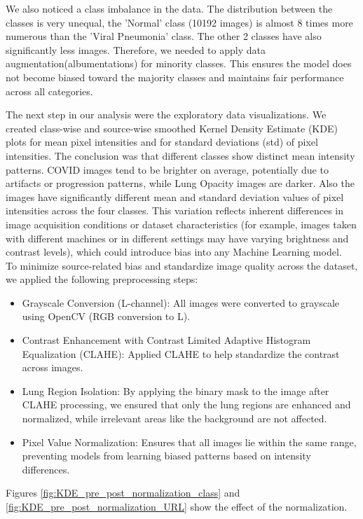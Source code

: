 \documentclass{article}
\begin{document}
We also noticed a class imbalance in the data. The distribution between the classes is very unequal, the 'Normal' class (10192 images) is almost 8 times more numerous than the 'Viral Pneumonia' class. The other 2 classes have also significantly less images. Therefore, we needed to apply data augmentation(albumentations) for minority classes. This ensures the model does not become biased toward the majority classes and maintains fair performance across all categories.

The next step in our analysis were the exploratory data visualizations. We created class-wise and source-wise smoothed Kernel Density Estimate (KDE) plots for mean pixel intensities and for standard deviations (std) of pixel intensities. The conclusion was that different classes show distinct mean intensity patterns. COVID images tend to be brighter on average, potentially due to artifacts or progression patterns, while Lung Opacity images are darker. Also the images have significantly different mean and standard deviation values of pixel intensities across the four classes. This variation reflects inherent differences in image acquisition conditions or dataset characteristics (for example, images taken with different machines or in different settings may have varying brightness and contrast levels), which could introduce bias into any Machine Learning model.\\
To minimize source-related bias and standardize image quality across the dataset, we applied the following preprocessing steps:
\begin{itemize}
    \item Grayscale Conversion (L-channel): All images were converted to grayscale using OpenCV (RGB conversion to L).
    \item Contrast Enhancement with Contrast Limited Adaptive Histogram Equalization (CLAHE): Applied CLAHE to help standardize the contrast across images.
    \item Lung Region Isolation: By applying the binary mask to the image after CLAHE processing, we ensured that only the lung regions are enhanced and normalized, while irrelevant areas like the background are not affected.
     \item Pixel Value Normalization: Ensures that all images lie within the same range, preventing models from learning biased patterns based on intensity differences.
\end{itemize}

Figures \ref{fig:KDE_pre_post_normalization_class} and \ref{fig:KDE_pre_post_normalization_URL} show the effect of the normalization. 
\end{document}
